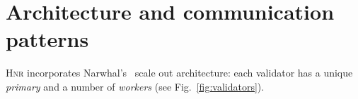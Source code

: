 \documentclass[%
dvipsnames]{article}
\theoremstyle{definition}
\newcommand{\Hnr}{\textsc{Hnr}\xspace}
\newcommand{\fig}[1][]{Fig.~}
\begin{document}






\section{Architecture and communication patterns}
\label{sec:communication-patterns}
 \Hnr incorporates Narwhal's~\cite{NT}
 scale out architecture: %
 each validator has a unique \emph{primary} and %
 a number of \emph{workers} %
 (see \fig\ref{fig:validators}).
\end{document}
